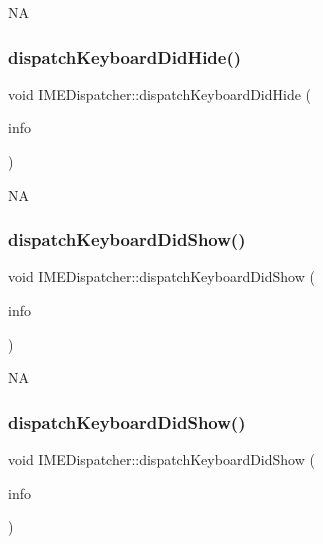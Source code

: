 NA \mbox{\label{classIMEDispatcher_a60699adf2ac55bcb25d1b7782299ec6e}} 
\subsubsection{\texorpdfstring{dispatch\+Keyboard\+Did\+Hide()}{dispatchKeyboardDidHide()}\hspace{0.1cm}{\footnotesize\ttfamily [2/2]}}
{\footnotesize\ttfamily void I\+M\+E\+Dispatcher\+::dispatch\+Keyboard\+Did\+Hide (\begin{DoxyParamCaption}\item[{\hyperlink{structIMEKeyboardNotificationInfo}{I\+M\+E\+Keyboard\+Notification\+Info} \&}]{info }\end{DoxyParamCaption})}

NA \mbox{\label{classIMEDispatcher_af5fab401ef02cb038de32f2b8f525284}} 
\subsubsection{\texorpdfstring{dispatch\+Keyboard\+Did\+Show()}{dispatchKeyboardDidShow()}\hspace{0.1cm}{\footnotesize\ttfamily [1/2]}}
{\footnotesize\ttfamily void I\+M\+E\+Dispatcher\+::dispatch\+Keyboard\+Did\+Show (\begin{DoxyParamCaption}\item[{\hyperlink{structIMEKeyboardNotificationInfo}{I\+M\+E\+Keyboard\+Notification\+Info} \&}]{info }\end{DoxyParamCaption})}

NA \mbox{\label{classIMEDispatcher_af5fab401ef02cb038de32f2b8f525284}} 
\subsubsection{\texorpdfstring{dispatch\+Keyboard\+Did\+Show()}{dispatchKeyboardDidShow()}\hspace{0.1cm}{\footnotesize\ttfamily [2/2]}}
{\footnotesize\ttfamily void I\+M\+E\+Dispatcher\+::dispatch\+Keyboard\+Did\+Show (\begin{DoxyParamCaption}\item[{\hyperlink{structIMEKeyboardNotificationInfo}{I\+M\+E\+Keyboard\+Notification\+Info} \&}]{info }\end{DoxyParamCaption})}

